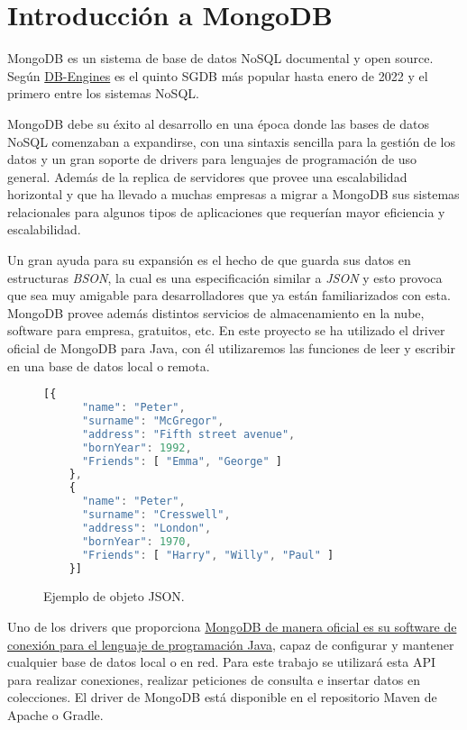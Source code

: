 \section{Introducción a MongoDB\label{02intro_MongoDB}}

MongoDB es un sistema de base de datos NoSQL documental y open source. Según \href{https://db-engines.com/en/ranking}{DB-Engines} es el quinto SGDB más popular hasta enero de 2022 y el primero entre los sistemas NoSQL.

MongoDB debe su éxito al desarrollo en una época donde las bases de datos NoSQL comenzaban a expandirse, con una sintaxis sencilla para la gestión de los datos y un gran soporte de drivers para lenguajes de programación de uso general. Además de la replica de servidores que provee una escalabilidad horizontal y que ha llevado a muchas empresas a migrar a MongoDB sus sistemas relacionales para algunos tipos de aplicaciones que requerían mayor eficiencia y escalabilidad.

Un gran ayuda para su expansión es el hecho de que guarda sus datos en estructuras \emph{BSON}, la cual es una especificación similar a \emph{JSON}\cite{json} y esto provoca que sea muy amigable para desarrolladores que ya están familiarizados con esta. MongoDB provee además distintos servicios de almacenamiento en la nube, software para empresa, gratuitos, etc. En este proyecto se ha utilizado el driver oficial de MongoDB para Java, con él utilizaremos las funciones de leer y escribir en una base de datos local o remota.


\begin{figure}[H]
  \begin{lstlisting}[language=JavaScript]
    [{
      "name": "Peter",
      "surname": "McGregor",
      "address": "Fifth street avenue",
      "bornYear": 1992,
      "Friends": [ "Emma", "George" ]
    },
    {
      "name": "Peter",
      "surname": "Cresswell",
      "address": "London",
      "bornYear": 1970,
      "Friends": [ "Harry", "Willy", "Paul" ]
    }]
  \end{lstlisting}
  \caption{Ejemplo de objeto JSON\cite{json}.}
\end{figure}

Uno de los drivers que proporciona \href{https://docs.mongodb.com/drivers/java/sync/current/quick-start/}{MongoDB de manera oficial es su software de conexión para el lenguaje de programación Java}, capaz de configurar y mantener cualquier base de datos local o en red. Para este trabajo se utilizará esta API para realizar conexiones, realizar peticiones de consulta e insertar datos en colecciones. El driver de MongoDB está disponible en el repositorio Maven de Apache o Gradle.

